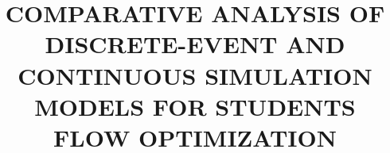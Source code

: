 \documentclass[12pt]{cspcccsthesis}
\title{COMPARATIVE ANALYSIS OF DISCRETE-EVENT AND CONTINUOUS SIMULATION MODELS FOR STUDENTS FLOW OPTIMIZATION}
\begin{document}

\begin{frontmatter}
    
    
    \makeAbstract
    \makeTOC
    \makeListOfTables
    \makeListOfFigures
\end{frontmatter}

\begin{thesisbody}
    
    
    
    
    
    \makeBibliography
    
    
\end{thesisbody}
\end{document}
